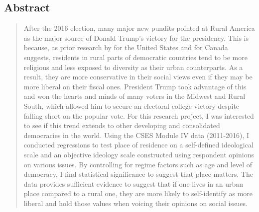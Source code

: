 \documentclass[12pt, titlepage]{article}
\title{\tb{Place of Residence and Political Attitudes in Democracies Worldwide }}
\author{Jennifer Lin}
\affil{New College of Florida}
\begin{document}
\begin{singlespace}
\maketitle
\end{singlespace}

\begin{center} %
\section*{Abstract} %
	
\begin{quote}
After the 2016 election, many major new pundits pointed at Rural America as the major source of Donald Trump’s victory for the presidency. This is because, as prior research by \cite{walsh_putting_2012} for the United States and \cite{walks_city-suburban_2005} for Canada suggests, residents in rural parts of democratic countries tend to be more religious and less exposed to diversity as their urban counterparts. As a result, they are more conservative in their social views even if they may be more liberal on their fiscal ones. President Trump took advantage of this and won the hearts and minds of many voters in the Midwest and Rural South, which allowed him to secure an electoral college victory despite falling short on the popular vote. For this research project, I was interested to see if this trend extends to other developing and consolidated democracies in the world. Using the CSES Module IV data (2011-2016), I conducted regressions to test place of residence on a self-defined ideological scale and an objective ideology scale constructed using respondent opinions on various issues. By controlling for regime factors such as age and level of democracy, I find statistical significance to suggest that place matters. The data provides sufficient evidence to suggest that if one lives in an urban place compared to a rural one, they are more likely to self-identify as more liberal and hold those values when voicing their opinions on social issues.

\end{quote}
\end{center}

\clearpage

\tableofcontents
\clearpage
\end{document}
